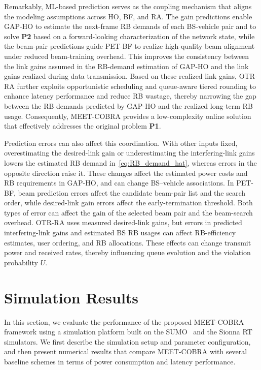 \documentclass[10pt,journal,letterpaper]{journal_template/IEEEtran}
\newcommand{\rev}[1]{\textcolor{revisioncolor}{{}#1}}
\theoremstyle{remark}
\begin{document}
Remarkably, ML-based prediction serves as the coupling mechanism that aligns the modeling assumptions across HO, BF, and RA. The gain predictions enable GAP-HO to estimate the next-frame RB demands of each BS-vehicle pair and to solve \textbf{P2} based on a forward-looking characterization of the network state, while the beam-pair predictions guide PET-BF to realize high-quality beam alignment under reduced beam-training overhead. This improves the consistency between the link gains assumed in the RB-demand estimation of GAP-HO and the link gains realized during data transmission. Based on these realized link gains, OTR-RA further exploits opportunistic scheduling and queue-aware tiered rounding to enhance latency performance and reduce RB wastage, thereby narrowing the gap between the RB demands predicted by GAP-HO and the realized long-term RB usage. Consequently, MEET-COBRA provides a low-complexity online solution that effectively addresses the original problem \textbf{P1}.


\rev{Prediction errors can also affect this coordination. With other inputs fixed, overestimating the desired-link gain or underestimating the interfering-link gains lowers the estimated RB demand in~\eqref{eq:RB_demand_hat}, whereas errors in the opposite direction raise it. These changes affect the estimated power costs and RB requirements in GAP-HO, and can change BS--vehicle associations. In PET-BF, beam prediction errors affect the candidate beam-pair list and the search order, while desired-link gain errors affect the early-termination threshold. Both types of error can affect the gain of the selected beam pair and the beam-search overhead. OTR-RA uses measured desired-link gains, but errors in predicted interfering-link gains and estimated BS RB usages can affect RB-efficiency estimates, user ordering, and RB allocations. These effects can change transmit power and received rates, thereby influencing queue evolution and the violation probability $U$.}

\section{Simulation Results}

In this section, we evaluate the performance of the proposed MEET-COBRA framework using a simulation platform built on the SUMO~\cite{behrisch2011sumo} and the Sionna RT~\cite{sionnaRT} simulators.
We first describe the simulation setup and parameter configuration, and then present numerical results that compare MEET-COBRA with several baseline schemes in terms of power consumption and latency performance.
\end{document}

